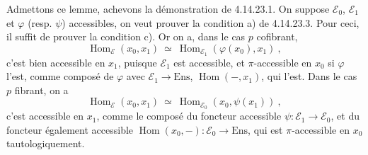 \documentclass[11pt]{article}
\newcommand{\printedpage}[1]{\marginpar{\footnotesize p.~#1}}
\newcommand{\Hom}{\operatorname{Hom}}
\newcommand{\Ens}{\mathrm{Ens}}
\begin{document}
\printedpage{157}
Admettons ce lemme, achevons la démonstration de 4.14.23.1. On suppose $\mathcal{E}_0$, $\mathcal{E}_1$ et $\varphi$ (resp. $\psi$) accessibles, on veut prouver la condition a) de 4.14.23.3. Pour ceci, il suffit de prouver la condition c). Or on a, dans le cas $p$ cofibrant, %
\[
\Hom_{\mathcal{E}}(x_0,x_1)\ \simeq\ \Hom_{\mathcal{E}_1}(\varphi(x_0),x_1)\ ,
\]
c'est bien accessible en $x_1$, puisque $\mathcal{E}_1$ est accessible, et $\pi$-accessible en $x_0$ si $\varphi$ l'est, comme composé de $\varphi$ avec $\mathcal{E}_1\longrightarrow\Ens$, $\Hom(-,x_1)$, qui l'est. Dans le cas $p$ fibrant, on a
\[
\Hom_{\mathcal{E}}(x_0,x_1)\ \simeq\ \Hom_{\mathcal{E}_0}(x_0,\psi(x_1))\ ,
\]
c'est accessible en $x_1$, comme le composé du foncteur accessible $\psi:\mathcal{E}_1\longrightarrow\mathcal{E}_0$, et du foncteur également accessible $\Hom(x_0,-):\mathcal{E}_0\longrightarrow\Ens$, qui est $\pi$-accessible en $x_0$ tautologiquement.
\end{document}
